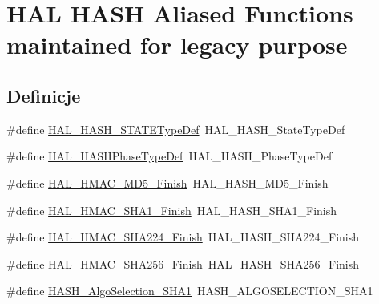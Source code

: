 \hypertarget{group___h_a_l___h_a_s_h___aliased___functions}{}\section{H\+AL H\+A\+SH Aliased Functions maintained for legacy purpose}
\label{group___h_a_l___h_a_s_h___aliased___functions}
\subsection*{Definicje}
\begin{DoxyCompactItemize}
\item 
\#define \hyperlink{group___h_a_l___h_a_s_h___aliased___functions_ga65a1583bf661ed4a6ffbf79f9cd73ff3}{H\+A\+L\+\_\+\+H\+A\+S\+H\+\_\+\+S\+T\+A\+T\+E\+Type\+Def}~H\+A\+L\+\_\+\+H\+A\+S\+H\+\_\+\+State\+Type\+Def
\item 
\#define \hyperlink{group___h_a_l___h_a_s_h___aliased___functions_gaeaab52d52ee43c52033f96d502c4876b}{H\+A\+L\+\_\+\+H\+A\+S\+H\+Phase\+Type\+Def}~H\+A\+L\+\_\+\+H\+A\+S\+H\+\_\+\+Phase\+Type\+Def
\item 
\#define \hyperlink{group___h_a_l___h_a_s_h___aliased___functions_ga9038c80d41c96129d3cca1d0daefc98b}{H\+A\+L\+\_\+\+H\+M\+A\+C\+\_\+\+M\+D5\+\_\+\+Finish}~H\+A\+L\+\_\+\+H\+A\+S\+H\+\_\+\+M\+D5\+\_\+\+Finish
\item 
\#define \hyperlink{group___h_a_l___h_a_s_h___aliased___functions_gaab29ddc3c3ff04d0988b5957d9499fff}{H\+A\+L\+\_\+\+H\+M\+A\+C\+\_\+\+S\+H\+A1\+\_\+\+Finish}~H\+A\+L\+\_\+\+H\+A\+S\+H\+\_\+\+S\+H\+A1\+\_\+\+Finish
\item 
\#define \hyperlink{group___h_a_l___h_a_s_h___aliased___functions_ga83c74f87944b8f73a11cb5dfa858f25c}{H\+A\+L\+\_\+\+H\+M\+A\+C\+\_\+\+S\+H\+A224\+\_\+\+Finish}~H\+A\+L\+\_\+\+H\+A\+S\+H\+\_\+\+S\+H\+A224\+\_\+\+Finish
\item 
\#define \hyperlink{group___h_a_l___h_a_s_h___aliased___functions_gaac86fd19acf8548fc6754c19e723d9f7}{H\+A\+L\+\_\+\+H\+M\+A\+C\+\_\+\+S\+H\+A256\+\_\+\+Finish}~H\+A\+L\+\_\+\+H\+A\+S\+H\+\_\+\+S\+H\+A256\+\_\+\+Finish
\item 
\#define \hyperlink{group___h_a_l___h_a_s_h___aliased___functions_gaa866d6ac9e86d2290b012681836f22d0}{H\+A\+S\+H\+\_\+\+Algo\+Selection\+\_\+\+S\+H\+A1}~H\+A\+S\+H\+\_\+\+A\+L\+G\+O\+S\+E\+L\+E\+C\+T\+I\+O\+N\+\_\+\+S\+H\+A1
\item 

\end{DoxyCompactItemize}
